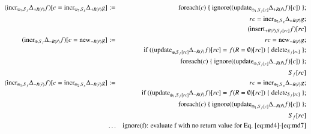 \documentclass{article}
\begin{document}
\begin{figure*}
\begin{eqnarray}
(\mathrm{incr}_{\oplus_1, S_f} \Delta_{+R(\vec{r})} f)
[c=\mathrm{incr}_{\oplus_2, S_g} \Delta_{+R(\vec{r})} g]
&:=&
\mathrm{foreach}(c) \; \{ \; \mathrm{ignore}((\mathrm{update}_{\oplus_1, S_{f}[c]} \Delta_{+R(\vec{r})} f)[c]) \; \} ;
\\
\nonumber && rc = \mathrm{incr}_{\oplus_2, S_g} \Delta_{+R(\vec{r})} g;
\\
\nonumber
&& (\mathrm{insert}_{+R(\vec{r}), S_{f}[rc]} f)[rc]
\\
\label{eq:md6}
(\mathrm{incr}_{\oplus, S_f}\Delta_{-R(\vec{r})} f)[c = \mathrm{new}_{-R(\vec{r})} g]
&:=&
rc = \mathrm{new}_{-R(\vec{r})} g;
\\
\nonumber &&
\mbox{if ($(\mathrm{update}_{\oplus, S_f[rc]} \Delta_{-R(\vec{r})} f)[rc] = f(R = \emptyset)[rc]$)}
\; \{ \; \mathrm{delete}_{S_f[rc]} \; \};
\\
\nonumber &&
\mathrm{foreach}(c) \; \{ \; \mathrm{ignore}((\mathrm{update}_{\oplus, S_f[c]}\Delta_{-R(\vec{r})} f)[c]) \; \};
\\
\nonumber && S_f[rc]
\\
\label{eq:md7}
(\mathrm{incr}_{\oplus_1, S_f} \Delta_{-R(\vec{r})} f)[c = \mathrm{incr}_{\oplus_2,S_g} \Delta_{-R(\vec{r})} g]
&:=&
rc = \mathrm{incr}_{\oplus_2, S_g} \Delta_{-R(\vec{r})} g;
\\
\nonumber &&
\mbox{if ($(\mathrm{update}_{\oplus_1, S_f[rc]} \Delta_{-R(\vec{r})} f)[rc] = f(R = \emptyset)[rc]$)}
\; \{ \; \mathrm{delete}_{S_f[rc]} \; \};
\\
\nonumber &&
\mathrm{foreach}(c) \; \{ \; \mathrm{ignore}((\mathrm{update}_{\oplus_1, S_f[c]}\Delta_{-R(\vec{r})} f)[c]) \; \};
\\
\nonumber && S_f[rc] \\
\nonumber &\dots& \mbox{ignore(f): evaluate f with no return value for Eq.~\ref{eq:md4}-\ref{eq:md7}}
\end{eqnarray}
\end{figure*}
\end{document}
